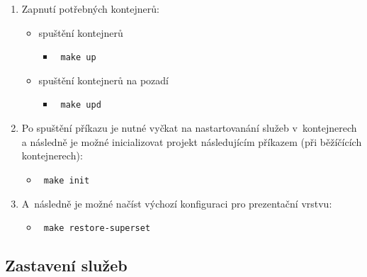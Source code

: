 \documentclass[10pt,a4paper,titlepage]{extarticle}
\begin{document}
    \begin{enumerate}
        \def\labelenumi{\arabic{enumi}.}
        \itemsep1pt\parskip0pt
        \item Zapnutí potřebných kontejnerů:

        \begin{itemize}
            \itemsep1pt\parskip0pt

            \item spuštění kontejnerů

            \begin{itemize}
                \itemsep1pt\parskip0pt
                \item[] \texttt{\textdollar\ make up}
            \end{itemize}

            \item spuštění kontejnerů na pozadí

            \begin{itemize}
                \itemsep1pt\parskip0pt
                \item[] \texttt{\textdollar\ make upd}
            \end{itemize}
        \end{itemize}

        \item Po spuštění příkazu je nutné vyčkat na nastartovanání služeb v~kontejnerech a následně je možné
        inicializovat projekt následujícím příkazem (při běžíčících kontejnerech):

        \begin{itemize}
            \itemsep1pt\parskip0pt
            \item[] \texttt{\textdollar\ make init}
        \end{itemize}

        \item A~následně je možné načíst výchozí konfiguraci pro prezentační vrstvu:

        \begin{itemize}
            \itemsep1pt\parskip0pt
            \item[] \texttt{\textdollar\ make restore-superset}
        \end{itemize}
    \end{enumerate}

    \subsection{Zastavení služeb}
\end{document}
